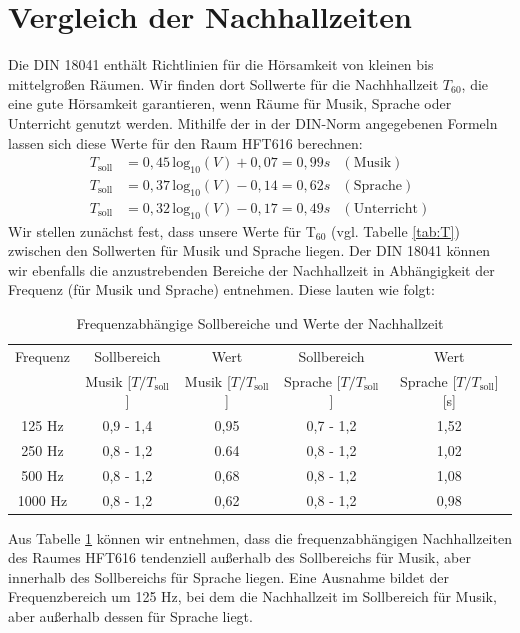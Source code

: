 \section{Vergleich der Nachhallzeiten}
\label{sec:ts}
Die DIN 18041 \cite{DIN_18041} enthält Richtlinien für die Hörsamkeit von kleinen bis mittelgroßen Räumen. 
Wir finden dort Sollwerte für die Nachhhallzeit $T_{60}$, die eine gute Hörsamkeit garantieren, wenn Räume für Musik, Sprache oder Unterricht genutzt werden.
Mithilfe der in der DIN-Norm angegebenen Formeln lassen sich diese Werte für den Raum HFT616 berechnen:
\begin{align*}
T_{\mathrm{soll}} &= 0,45\, \mathrm{log}_{10} (V)+0,07 = 0,99 s & \mathrm{(Musik)}\\
T_{\mathrm{soll}} &= 0,37\, \mathrm{log}_{10} (V)-0,14 = 0,62 s & \mathrm{(Sprache)} \\
T_{\mathrm{soll}} &= 0,32\, \mathrm{log}_{10} (V)-0,17 = 0,49 s& \mathrm{(Unterricht)}
\end{align*}
Wir stellen zunächst fest, dass unsere Werte für T$_{60}$ (vgl. Tabelle \ref{tab:T}) zwischen den Sollwerten für Musik und Sprache liegen. 
Der DIN 18041 können wir ebenfalls die anzustrebenden Bereiche der Nachhallzeit in Abhängigkeit der Frequenz (für Musik und Sprache) entnehmen. Diese lauten wie folgt:
\begin{table}[H]
    \centering
    \caption{Frequenzabhängige Sollbereiche und Werte der Nachhallzeit}
    \label{tab:Tsoll}
    \begin{tabular}[\textwidth]{|c|c|c|c|c|}
    \hline
        Frequenz & Sollbereich& Wert&Sollbereich &Wert\\
        & Musik [$T/T_{\mathrm{soll}}$] & Musik [$T/T_{\mathrm{soll}}$] & Sprache [$T/T_{\mathrm{soll}}$]  & Sprache [$T/T_{\mathrm{soll}}$] [s] \\
        \hline
        125 Hz &0,9 - 1,4 & 0,95 &0,7 - 1,2  & 1,52  \\
        250 Hz &0,8 - 1,2 & 0.64 &0,8 - 1,2 & 1,02 \\
        500 Hz &0,8 - 1,2 &0,68 &0,8 - 1,2 &1,08 \\
        1000 Hz & 0,8 - 1,2 & 0,62& 0,8 - 1,2& 0,98 \\
        \hline
    \end{tabular}
\end{table}
Aus Tabelle \ref{tab:Tsoll} können wir entnehmen, dass die frequenzabhängigen Nachhallzeiten des Raumes HFT616 tendenziell außerhalb des Sollbereichs für Musik, aber innerhalb des Sollbereichs für Sprache liegen. Eine Ausnahme bildet der Frequenzbereich um 125 Hz, bei dem die Nachhallzeit im Sollbereich für Musik, aber außerhalb dessen für Sprache liegt. 

